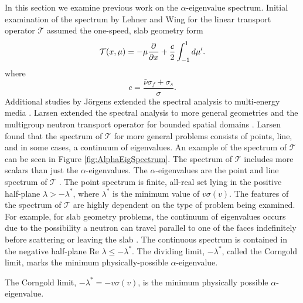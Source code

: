 In this section we examine previous work on the $\alpha$-eigenvalue spectrum. Initial examination of the spectrum by Lehner and Wing \cite{lehner_spectrum_1955} for the linear transport operator $\mathcal{T}$ assumed the one-speed, slab geometry form
\begin{equation}
	\mathcal{T}(x,\mu) = -\mu \frac{\partial}{\partial x} + \frac{c}{2} \int_{-1}^{1} \mathop{}\!d \mu'.
\end{equation}
where
\begin{equation}
	c = \frac{\bar{\nu} \sigma_{f} + \sigma_{s}}{\sigma}.
\end{equation}
Additional studies by J{\"o}rgens extended the spectral analysis to multi-energy media \cite{jorgens_asymptotic_1958}. Larsen extended the spectral analysis to more general geometries \cite{larsen_spectrum_1974} and the multigroup neutron transport operator for bounded spatial domains \cite{larsen_spectrum_1979}. Larsen found that the spectrum of $\mathcal{T}$ for more general problems consists of points, line, and in some cases, a continuum of eigenvalues. An example of the spectrum of $\mathcal{T}$ can be seen in Figure \ref{fig:AlphaEigSpectrum}. The spectrum of $\mathcal{T}$ includes more scalars than just the $\alpha$-eigenvalues. The $\alpha$-eigenvalues are the point and line spectrum of $\mathcal{T}$ \cite{duderstadt_transport_1979}. The point spectrum is finite, all-real set lying in the positive half-plane $\lambda > -\lambda^{*}$, where $\lambda^{*}$ is the minimum value of $v\sigma(v)$. The features of the spectrum of $\mathcal{T}$ are highly dependent on the type of problem being examined. For example, for slab geometry problems, the continuum of eigenvalues occurs due to the possibility a neutron can travel parallel to one of the faces indefinitely before scattering or leaving the slab \cite{wing_transport_1962}. The continuous spectrum is contained in the negative half-plane Re $\lambda \le -\lambda^{*}$. The dividing limit, $-\lambda^{*}$, called the Corngold limit, marks the minimum physically-possible $\alpha$-eigenvalue.

\begin{theorem}
	The Corngold limit, $-\lambda^{*} = -v\sigma(v)$, is the minimum physically possible $\alpha$-eigenvalue.
\end{theorem}

